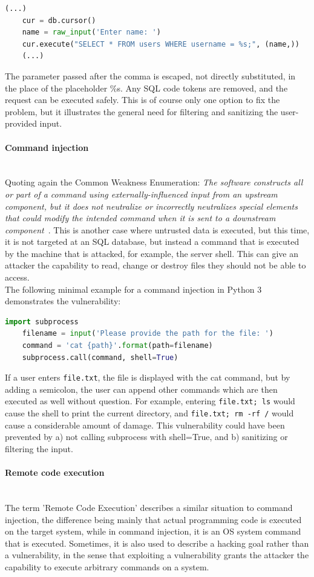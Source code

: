 \documentclass[
a4paper,
pagesize,
pdftex,
12pt,
twoside, %
BCOR=5mm, %
ngerman,
fleqn,
final,
]{scrartcl}
\begin{document}
	\begin{lstlisting}[language=Python,showstringspaces=false]
	(...)
	cur = db.cursor()
	name = raw_input('Enter name: ')
	cur.execute("SELECT * FROM users WHERE username = %s;", (name,))
	(...)
	\end{lstlisting}
	The parameter passed after the comma is escaped, not directly substituted, in the place of the placeholder \%s. Any SQL code tokens are removed, and the request can be executed safely. This is of course only one option to fix the problem, but it illustrates the general need for filtering and sanitizing the user-provided input. 
	
	\paragraph{Command injection}\mbox{}\\
	Quoting again the Common Weakness Enumeration: \textit{The software constructs all or part of a command using externally-influenced input from an upstream component, but it does not neutralize or incorrectly neutralizes special elements that could modify the intended command when it is sent to a downstream component}~\cite{CommonWeaknessEnumeration.23.9.2019}. This is another case where untrusted data is executed, but this time, it is not targeted at an SQL database, but instead a command that is executed by the machine that is attacked, for example, the server shell. This can give an attacker the capability to read, change or destroy files they should not be able to access. \\
	The following minimal example for a command injection in Python 3 demonstrates the vulnerability:
	\begin{lstlisting}[language=Python,showstringspaces=false]
	import subprocess
	filename = input('Please provide the path for the file: ')
	command = 'cat {path}'.format(path=filename)
	subprocess.call(command, shell=True)
	\end{lstlisting}
	If a user enters \texttt{file.txt}, the file is displayed with the cat command, but by adding a semicolon, the user can append other commands which are then executed as well without question. For example, entering \texttt{file.txt; ls} would cause the shell to print the current directory, and \texttt{file.txt; rm -rf /} would cause a considerable amount of damage. This vulnerability could have been prevented by a) not calling subprocess with shell=True, and b) sanitizing or filtering the input. 
	
	\paragraph{Remote code execution}\mbox{}\\
	The term 'Remote Code Execution' describes a similar situation to command injection, the difference being mainly that actual programming code is executed on the target system, while in command injection, it is an OS system command that is executed. Sometimes, it is also used to describe a hacking goal rather than a vulnerability, in the sense that exploiting a vulnerability grants the attacker the capability to execute arbitrary commands on a system. 
	
\end{document}
